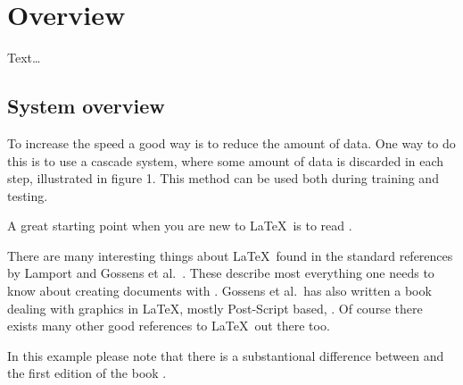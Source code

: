 \chapter{Overview}
\label{sec:Overview}

Text\dots

\section{System overview}
\label{sec:System overview}

To increase the speed a good way is to reduce the amount of data. One way to do this is to use a cascade system, where some amount of data is discarded in each step, illustrated in figure 1. This method can be used both during training and testing.

A great starting point when you are new to \LaTeX\ is to read
\cite{oetikerPHS:2004}.

There are many interesting things about \LaTeX\ found in the standard
references by Lamport \cite{lamport:1994} and Gossens et al.\
\cite{companion:2004}. These describe most everything one needs to
know about creating documents with \LaTeXe.  Gossens et al.\ has also
written a book dealing with graphics in \LaTeX, mostly Post-Script
based, \cite{companionG:1997}. Of course there exists many other good
references to \LaTeX\ out there too.

\begin{example}
  In this example please note that there is a substantional difference
  between \cite{companion:2004} and the first edition of the book
  \cite{companion:1994}.
\end{example}


